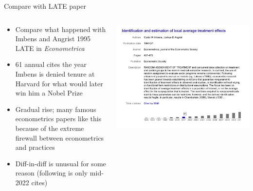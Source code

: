 \documentclass{beamer}
\begin{document}
\begin{frame}{Compare with LATE paper}
  \begin{columns}
    \begin{column}{0.5\textwidth}
      \begin{itemize}
\item Compare what happened with Imbens and Angrist 1995 LATE in \emph{Econometrica}
\item 61 annual cites the year Imbens is denied tenure at Harvard for what would later win him a Nobel Prize
\item Gradual rise; many famous econometrics papers like this because of the extreme firewall between econometrics and practices
\item Diff-in-diff is unusual for some reason (following is only mid-2022 cites)
      \end{itemize}
    \end{column}
    \begin{column}{0.5\textwidth}
      \includegraphics[scale=0.25]{./lecture_includes/guido_late}
    \end{column}
  \end{columns}
\end{frame}
\end{document}
